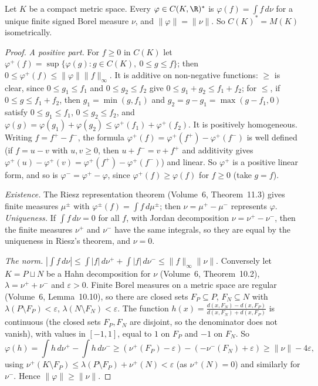 \begin{theorem}\label{thm:rieszmarkov}
Let $K$ be a compact metric space. Every $\varphi\in C(K,\R)^*$ is $\varphi(f)=\int f\,d\nu$ for a unique finite signed Borel measure $\nu$, and $\|\varphi\|=\|\nu\|$. So $C(K)^*=M(K)$ isometrically.
\end{theorem}
\begin{proof}
\emph{A positive part.} For $f\ge0$ in $C(K)$ let $\varphi^+(f)=\sup\{\varphi(g):g\in C(K),\ 0\le g\le f\}$; then $0\le\varphi^+(f)\le\|\varphi\|\|f\|_\infty$. It is additive on non-negative functions: $\ge$ is clear, since
$0\le g_1\le f_1$ and $0\le g_2\le f_2$ give $0\le g_1+g_2\le f_1+f_2$; for $\le$, if $0\le g\le f_1+f_2$, then $g_1=\min(g,f_1)$ and $g_2=g-g_1=\max(g-f_1,0)$ satisfy $0\le g_1\le f_1$, $0\le g_2\le f_2$, and
$\varphi(g)=\varphi(g_1)+\varphi(g_2)\le\varphi^+(f_1)+\varphi^+(f_2)$. It is positively homogeneous. Writing $f=f^+-f^-$, the formula $\varphi^+(f)=\varphi^+(f^+)-\varphi^+(f^-)$ is well defined (if $f=u-v$ with $u,v\ge0$,
then $u+f^-=v+f^+$ and additivity gives $\varphi^+(u)-\varphi^+(v)=\varphi^+(f^+)-\varphi^+(f^-)$) and linear. So $\varphi^+$ is a positive linear form, and so is $\varphi^-=\varphi^+-\varphi$, since $\varphi^+(f)\ge\varphi(f)$ for $f\ge0$
(take $g=f$).

\emph{Existence.} The Riesz representation theorem (Volume~6, Theorem~11.3) gives finite measures $\mu^\pm$ with $\varphi^\pm(f)=\int f\,d\mu^\pm$; then $\nu=\mu^+-\mu^-$ represents $\varphi$. \emph{Uniqueness.} If $\int f\,d\nu=0$ for all
$f$, with Jordan decomposition $\nu=\nu^+-\nu^-$, then the finite measures $\nu^+$ and $\nu^-$ have the same integrals, so they are equal by the uniqueness in Riesz's theorem, and $\nu=0$.

\emph{The norm.} $|\int f\,d\nu|\le\int|f|\,d\nu^++\int|f|\,d\nu^-\le\|f\|_\infty\|\nu\|$. Conversely let $K=P\sqcup N$ be a Hahn decomposition for $\nu$ (Volume~6, Theorem~10.2), $\lambda=\nu^++\nu^-$ and $\varepsilon>0$. Finite Borel
measures on a metric space are regular (Volume~6, Lemma~10.10), so there are closed sets $F_P\subseteq P$, $F_N\subseteq N$ with $\lambda(P\setminus F_P)<\varepsilon$, $\lambda(N\setminus F_N)<\varepsilon$. The function
$h(x)=\frac{d(x,F_N)-d(x,F_P)}{d(x,F_N)+d(x,F_P)}$ is continuous (the closed sets $F_P,F_N$ are disjoint, so the denominator does not vanish), with values in $[-1,1]$, equal to $1$ on $F_P$ and $-1$ on $F_N$. So
\[\varphi(h)=\int h\,d\nu^+-\int h\,d\nu^-\ge(\nu^+(F_P)-\varepsilon)-(-\nu^-(F_N)+\varepsilon)\ge\|\nu\|-4\varepsilon,\]
using $\nu^+(K\setminus F_P)\le\lambda(P\setminus F_P)+\nu^+(N)<\varepsilon$ (as $\nu^+(N)=0$) and similarly for $\nu^-$. Hence $\|\varphi\|\ge\|\nu\|$.
\end{proof}

